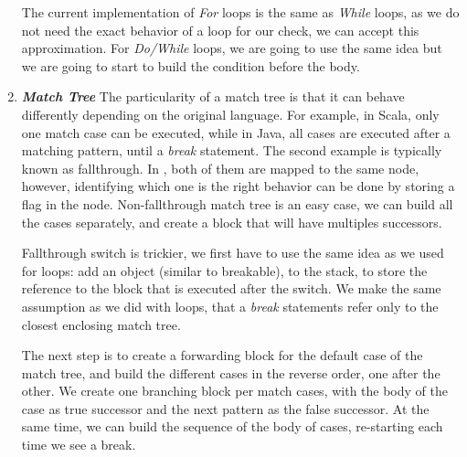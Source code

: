 \begin{enumerate}
	The current implementation of \emph{For} loops is the same as \emph{While} loops, as we do not need the exact behavior of a loop for our check, we can accept this approximation.
	For \emph{Do/While} loops, we are going to use the same idea but we are going to start to build the condition before the body.
	
	\item \textbf{\textit{Match Tree}} \newline 
	\label{subsubsec:match_tree_cfg}
	The particularity of a match tree is that it can behave differently depending on the original language.
	For example, in Scala, only one match case can be executed, while in Java, all cases are executed after a matching pattern, until a \emph{break} statement.
	The second example is typically known as fallthrough. 
	In \slang{}, both of them are mapped to the same node, however, identifying which one is the right behavior can be done by storing a flag in the node.
	Non-fallthrough match tree is an easy case, we can build all the cases separately, and create a block that will have multiples successors.
	
	Fallthrough switch is trickier, we first have to use the same idea as we used for loops: add an object (similar to breakable), to the stack, to store the reference to the block that is executed after the switch. 
	We make the same assumption as we did with loops, that a \emph{break} statements refer only to the closest enclosing match tree. 
	
	The next step is to create a forwarding block for the default case of the match tree, and build the different cases in the reverse order, one after the other. 
	We create one branching block per match cases, with the body of the case as true successor and the next pattern as the false successor. 
	At the same time, we can build the sequence of the body of cases, re-starting each time we see a break.
	
	
	

\end{enumerate}
